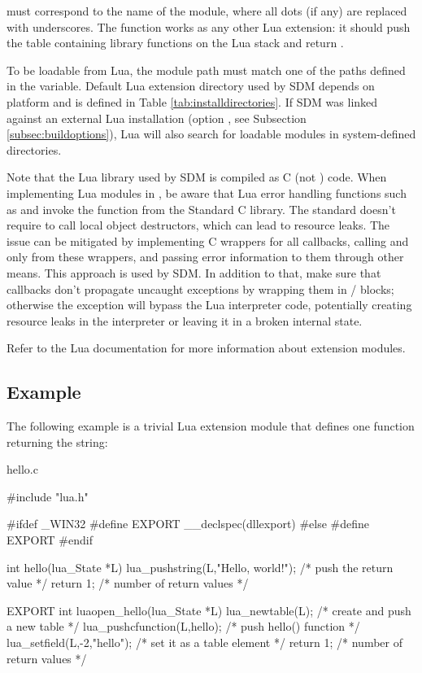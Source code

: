 \documentclass[a4paper,12pt,twoside,extrafontsizes]{memoir}
\begin{document}
 must correspond to the name of the module, where all dots (if any) are replaced with underscores. The function works as any other Lua extension: it should push the table containing library functions on the Lua stack and return .

To be loadable from Lua, the module path must match one of the paths defined in the  variable. Default Lua extension directory used by SDM depends on platform and is defined in Table \ref{tab:installdirectories}. If SDM was linked against an external Lua installation (option , see Subsection \ref{subsec:buildoptions}), Lua will also search for loadable modules in system-defined directories.

Note that the Lua library used by SDM is compiled as C (not \cplusplus) code. When implementing Lua modules in \cplusplus, be aware that Lua error handling functions such as  and  invoke the  function from the Standard C library. The \cplusplus{} standard doesn't require  to call local object destructors, which can lead to resource leaks. The issue can be mitigated by implementing C wrappers for all \cplusplus{} callbacks, calling  and  only from these wrappers, and passing error information to them through other means. This approach is used by SDM. In addition to that, make sure that callbacks don't propagate uncaught \cplusplus{} exceptions by wrapping them in / blocks; otherwise the exception will bypass the Lua interpreter code, potentially creating resource leaks in the interpreter or leaving it in a broken internal state.

Refer to the Lua documentation for more information about extension modules.

\subsection{Example}

The following example is a trivial Lua extension module that defines one function  returning the  string:

\begin{breakshellcmdsnamed}{hello.c}\begin{ccode}
#include "lua.h"

#ifdef _WIN32
    #define EXPORT __declspec(dllexport)
#else
    #define EXPORT
#endif

int hello(lua_State *L) {
    lua_pushstring(L,"Hello, world!"); /* push the return value */
    return 1; /* number of return values */
}

EXPORT int luaopen_hello(lua_State *L) {
    lua_newtable(L); /* create and push a new table */
    lua_pushcfunction(L,hello); /* push hello() function */
    lua_setfield(L,-2,"hello"); /* set it as a table element */
    return 1; /* number of return values */
}
\end{ccode}\end{breakshellcmdsnamed}
\end{document}
